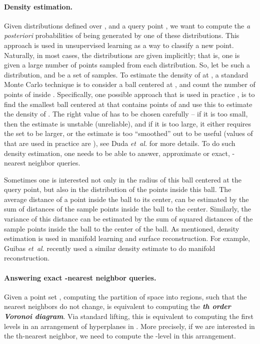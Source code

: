 \documentclass[12pt]{article}
\newcommand{\emphic}[2]{\textcolor{blue25}{\textbf{\emph{#1}}}\index{#2}}
\newcommand{\emphi}[1]{\emphic{#1}{#1}}
\theoremstyle{remark}{\theorembodyfont{\rm} \newtheorem{remark}[theorem]{Remark}}
\newcommand{\etal}{\textit{et~al.}\xspace}
\renewcommand{\th}{th\xspace}
\begin{document}
\paragraph{Density estimation.}
Given distributions  defined over , and a
query point , we want to compute the \emph{a
   posteriori} probabilities of  being generated by one of
these distributions. This approach is used in unsupervised learning as
a way to classify a new point. Naturally, in most cases, the
distributions are given implicitly; that is, one is given a large
number of points sampled from each distribution. So, let  be such
a distribution, and  be a set of  samples. To estimate the
density of  at , a standard Monte Carlo technique is to
consider a ball  centered at , and count the number of
points of  inside .  Specifically, one possible
approach that is used in practice \cite{dhs-pc-01}, is to find the
smallest ball centered at  that contains  points of
 and use this to estimate the density of .  The
right value of  has to be chosen carefully -- if it is too small,
then the estimate is unstable (unreliable), and if it is too large, it
either requires the set  to be larger, or the estimate is too
``smoothed'' out to be useful (values of  that are used in practice
are ), see Duda \etal \cite{dhs-pc-01} for more
details. To do such density estimation, one needs to be able to answer,
approximate or exact, -nearest neighbor queries.

Sometimes one is interested not only in the radius of this ball
centered at the query point, but also in the distribution of the
points inside this ball. The average distance of a point inside the
ball to its center, can be estimated by the sum of distances of the sample
points inside the ball to the center. Similarly, the variance of this
distance can be estimated by the sum of squared distances of the
sample points inside the ball to the center of the ball.  As mentioned, 
density estimation is used in manifold learning and surface
reconstruction. For example, Guibas \etal \cite{gmm-wkd-11} recently
used a similar density estimate to do manifold reconstruction.


\paragraph{Answering exact -nearest neighbor queries.}

Given a point set , computing the partition
of space into regions, such that the  nearest neighbors do not
change, is equivalent to computing the \emphi{\th order Voronoi
   diagram}.  Via standard lifting, this is equivalent to computing
the first  levels in an arrangement of hyperplanes in 
\cite{a-vdsfg-91}. More precisely, if we are interested in the
\th-nearest neighbor, we need to compute the -level in this
arrangement.
\end{document}
